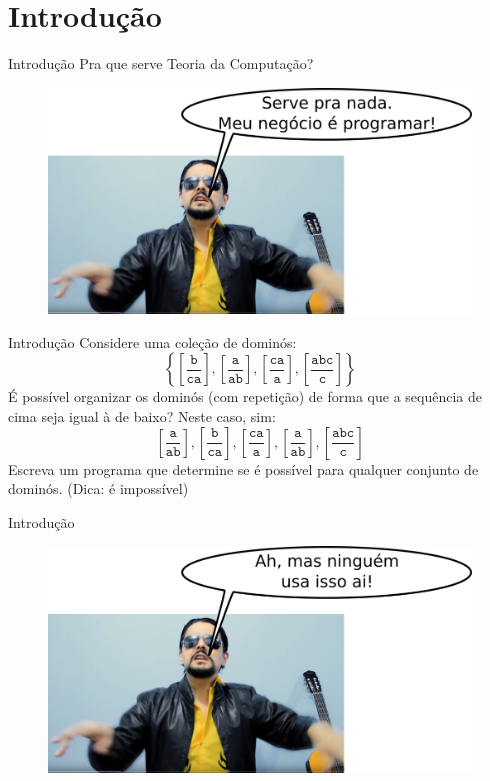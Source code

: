 \documentclass{beamer}
\begin{document}
\section{Introdução}
\begin{frame}{Introdução}
	Pra que serve Teoria da Computação?
	\pause
	\begin{figure}
		\includegraphics[width=0.7\paperwidth]{resources/chico}
	\end{figure}
\end{frame}
\begin{frame}{Introdução}
	Considere uma coleção de dominós:
	\begin{equation*}
	\left\{
	\left[ \frac{\texttt{b}}{\texttt{ca}} \right],
	\left[ \frac{\texttt{a}}{\texttt{ab}} \right],
	\left[ \frac{\texttt{ca}}{\texttt{a}} \right],
	\left[ \frac{\texttt{abc}}{\texttt{c}} \right]
	\right\}
	\end{equation*}
	É possível organizar os dominós (com repetição) de forma que a sequência de cima seja igual à de baixo?
	\pause
	Neste caso, sim:
	\begin{equation*}
	\left[ \frac{\texttt{a}}{\texttt{ab}} \right],
	\left[ \frac{\texttt{b}}{\texttt{ca}} \right],
	\left[ \frac{\texttt{ca}}{\texttt{a}} \right],
	\left[ \frac{\texttt{a}}{\texttt{ab}} \right],
	\left[ \frac{\texttt{abc}}{\texttt{c}} \right]
	\end{equation*}
	\pause
	Escreva um programa que determine se é possível para qualquer conjunto de dominós. \pause (Dica: \alert{é impossível})
\end{frame}
\begin{frame}{Introdução}
	\begin{figure}
		\includegraphics[width=0.7\paperwidth]{resources/chico2}
	\end{figure}
\end{frame}
\end{document}

